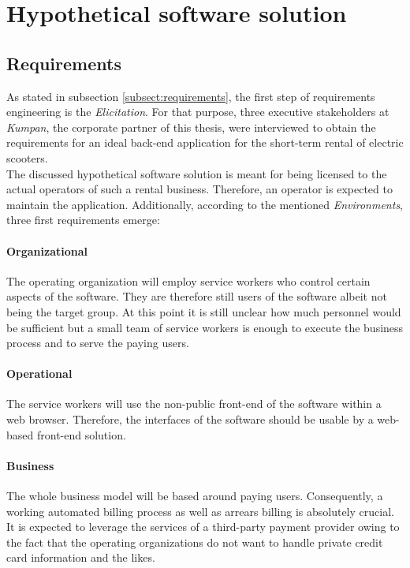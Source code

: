 \documentclass[12pt,a4paper]{report}
\begin{document}
\section{Hypothetical software solution} \label{sect:hypothetical-solution}

\subsection{Requirements}

As stated in subsection \ref{subsect:requirements}, the first step of
requirements engineering is the \textit{Elicitation}.
For that purpose, three executive stakeholders
at \textit{Kumpan}, the corporate partner of this thesis, were interviewed
to obtain the requirements for an ideal back-end application for the
short-term rental of electric scooters.\\
The discussed hypothetical software solution is meant for being licensed to
the actual operators of such a rental business. Therefore, an operator
is expected to maintain the application. Additionally, according to the
mentioned \textit{Environments}, three first requirements emerge:

\paragraph{Organizational}
The operating organization will employ service workers who
control certain aspects of the software. They are therefore still users of the
software albeit not being the target group. At this point it is still unclear
how much personnel would be sufficient but a small team of service workers is
enough to execute the business process and to serve the paying users.

\paragraph{Operational}
The service workers will use the non-public front-end of the software within a
web browser. Therefore, the interfaces of the software should be usable by
a web-based front-end solution.

\paragraph{Business}
The whole business model will be based around paying users. Consequently,
a working automated billing process as well as arrears billing is absolutely
crucial. It is expected to leverage the services of a third-party payment
provider owing to the fact that the operating organizations do not want to
handle private credit card information and the likes.
\end{document}

